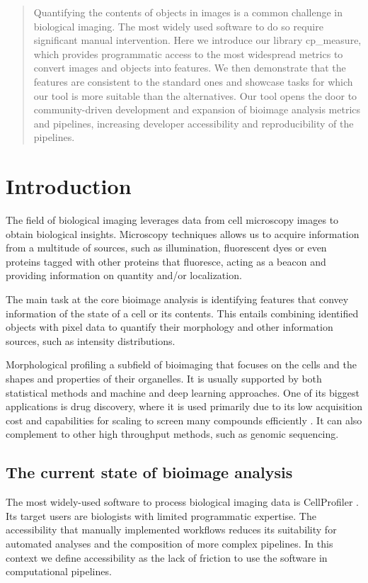\documentclass{article}
\begin{document}
\begin{abstract}
Quantifying the contents of objects in images is a common challenge in biological imaging. The most widely used software to do so require significant manual intervention. Here we introduce our library cp\_measure, which provides programmatic access to the most widespread metrics to convert images and objects into features. We then demonstrate that the features are consistent to the standard ones and showcase tasks for which our tool is more suitable than the alternatives. Our tool opens the door to community-driven  development and expansion of bioimage analysis metrics and pipelines, increasing developer accessibility and reproducibility of the pipelines.
\end{abstract}
\section{Introduction}
\label{sec:org372736e}
The field of biological imaging leverages data from cell microscopy images to obtain biological insights. Microscopy techniques allows us to acquire information from a multitude of sources, such as illumination, fluorescent dyes or even proteins tagged with other proteins that fluoresce, acting as a beacon and providing information on quantity and/or localization.

The main task at the core bioimage analysis is identifying features that convey information of the state of a cell or its contents. This entails combining identified objects with pixel data to quantify their morphology and other information sources, such as intensity distributions.

Morphological profiling a subfield of bioimaging that focuses on the cells and the shapes and properties of their organelles. It is usually supported by both statistical methods and machine and deep learning approaches. One of its biggest applications is drug discovery, where it is used primarily due to its low acquisition cost and capabilities for scaling to screen many compounds efficiently \citep{sealDecadeSystematicReview2024}. It can also complement to other high throughput methods, such as genomic sequencing.
\subsection{The current state of bioimage analysis}
\label{sec:org1c5c74c}
The most widely-used software to process biological imaging data is CellProfiler \citep{stirlingCellProfiler4Improvements2021}. Its target users are biologists with limited programmatic expertise. The accessibility that manually implemented workflows reduces its suitability for automated analyses and the composition of more complex pipelines. In this context we define accessibility as the lack of friction to use the software in computational pipelines.
\end{document}
